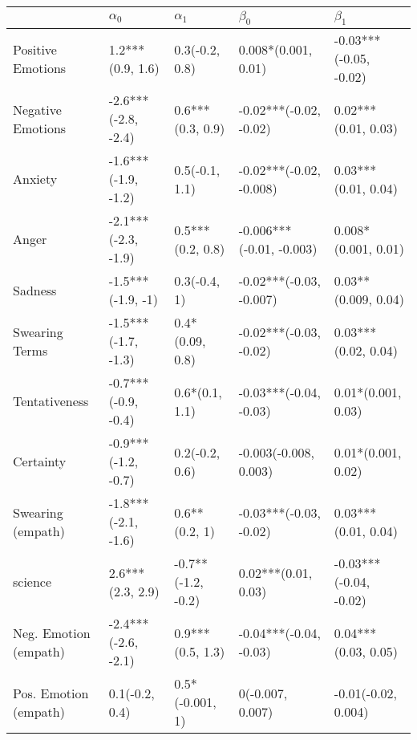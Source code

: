 \begin{tabular}{lllll}
\toprule
{} &           $\alpha_0$ &          $\alpha_1$ &                 $\beta_0$ &               $\beta_1$ \\
\midrule
Positive Emotions     &     1.2***(0.9, 1.6) &      0.3(-0.2, 0.8) &       0.008*(0.001, 0.01) &  -0.03***(-0.05, -0.02) \\
Negative Emotions     &  -2.6***(-2.8, -2.4) &    0.6***(0.3, 0.9) &    -0.02***(-0.02, -0.02) &     0.02***(0.01, 0.03) \\
Anxiety               &  -1.6***(-1.9, -1.2) &      0.5(-0.1, 1.1) &   -0.02***(-0.02, -0.008) &     0.03***(0.01, 0.04) \\
Anger                 &  -2.1***(-2.3, -1.9) &    0.5***(0.2, 0.8) &  -0.006***(-0.01, -0.003) &     0.008*(0.001, 0.01) \\
Sadness               &    -1.5***(-1.9, -1) &        0.3(-0.4, 1) &   -0.02***(-0.03, -0.007) &     0.03**(0.009, 0.04) \\
Swearing Terms        &  -1.5***(-1.7, -1.3) &     0.4*(0.09, 0.8) &    -0.02***(-0.03, -0.02) &     0.03***(0.02, 0.04) \\
Tentativeness         &  -0.7***(-0.9, -0.4) &      0.6*(0.1, 1.1) &    -0.03***(-0.04, -0.03) &      0.01*(0.001, 0.03) \\
Certainty             &  -0.9***(-1.2, -0.7) &      0.2(-0.2, 0.6) &     -0.003(-0.008, 0.003) &      0.01*(0.001, 0.02) \\
Swearing (empath)     &  -1.8***(-2.1, -1.6) &       0.6**(0.2, 1) &    -0.03***(-0.03, -0.02) &     0.03***(0.01, 0.04) \\
science               &     2.6***(2.3, 2.9) &  -0.7**(-1.2, -0.2) &       0.02***(0.01, 0.03) &  -0.03***(-0.04, -0.02) \\
Neg. Emotion (empath) &  -2.4***(-2.6, -2.1) &    0.9***(0.5, 1.3) &    -0.04***(-0.04, -0.03) &     0.04***(0.03, 0.05) \\
Pos. Emotion (empath) &       0.1(-0.2, 0.4) &     0.5*(-0.001, 1) &          0(-0.007, 0.007) &     -0.01(-0.02, 0.004) \\
\bottomrule
\end{tabular}

